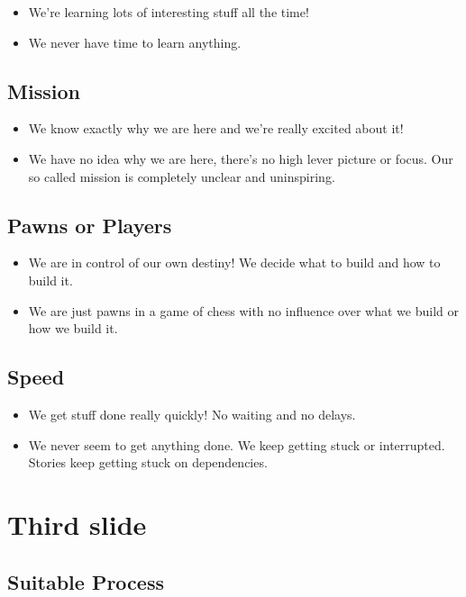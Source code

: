 \documentclass[a4paper]{article}
\begin{document}
\begin{itemize}
\item We're learning lots of interesting stuff all the time!
\item We never have time to learn anything.
\end{itemize}

\subsection{Mission}

\begin{itemize}
\item We know exactly why we are here and we’re really excited about it!
\item We have no idea why we are here, there's no high lever picture or focus. Our so called mission is completely unclear and uninspiring.
\end{itemize}

\subsection{Pawns or Players}

\begin{itemize}
\item We are in control of our own destiny! We decide what to build and how to build it.
\item We are just pawns in a game of chess with no influence over what we build or how we build it.
\end{itemize}

\subsection{Speed}

\begin{itemize}
\item We get stuff done really quickly! No waiting and no delays.
\item We never seem to get anything done. We keep getting stuck or interrupted. Stories keep getting stuck on dependencies.
\end{itemize}

\section{Third slide}

\subsection{Suitable Process}
\end{document}

